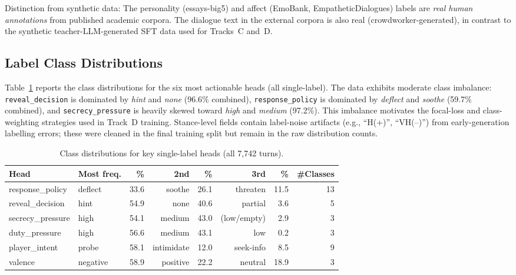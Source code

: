 \documentclass[11pt]{article}
\begin{document}
Distinction from synthetic data: The personality (essays-big5) and affect (EmoBank, EmpatheticDialogues) labels are \textit{real human annotations} from published academic corpora.
The dialogue text in the external corpora is also real (crowdworker-generated), in contrast to the synthetic teacher-LLM-generated SFT data used for Tracks~C and~D.

\subsection{Label Class Distributions}

Table~\ref{tab:label_dist} reports the class distributions for the six most actionable heads (all single-label).
The data exhibits moderate class imbalance: \texttt{reveal\_decision} is dominated by \textit{hint} and \textit{none} (96.6\% combined), \texttt{response\_policy} is dominated by \textit{deflect} and \textit{soothe} (59.7\% combined), and \texttt{secrecy\_pressure} is heavily skewed toward \textit{high} and \textit{medium} (97.2\%).
This imbalance motivates the focal-loss and class-weighting strategies used in Track~D training.
Stance-level fields contain label-noise artifacts (e.g., ``H(+)'', ``VH(--)'') from early-generation labelling errors; these were cleaned in the final training split but remain in the raw distribution counts.

\begin{table}[tp]
\centering
\caption{Class distributions for key single-label heads (all 7,742 turns).}
\label{tab:label_dist}
\footnotesize\setlength{\tabcolsep}{2.5pt}
\begin{tabular}{@{}llrrrrrr@{}}
\toprule
\textbf{Head} & \textbf{Most freq.} & \textbf{\%} & \textbf{2nd} & \textbf{\%} & \textbf{3rd} & \textbf{\%} & \textbf{\#Classes} \\
\midrule
response\_policy  & deflect   & 33.6 & soothe    & 26.1 & threaten   & 11.5 & 13 \\
reveal\_decision   & hint      & 54.9 & none      & 40.6 & partial    &  3.6 & 5  \\
secrecy\_pressure  & high      & 54.1 & medium    & 43.0 & (low/empty)&  2.9 & 3  \\
duty\_pressure     & high      & 56.6 & medium    & 43.1 & low        &  0.2 & 3  \\
player\_intent     & probe     & 58.1 & intimidate& 12.0 & seek-info  &  8.5 & 9  \\
valence           & negative  & 58.9 & positive  & 22.2 & neutral    & 18.9 & 3  \\
\bottomrule
\end{tabular}
\end{table}
\end{document}
